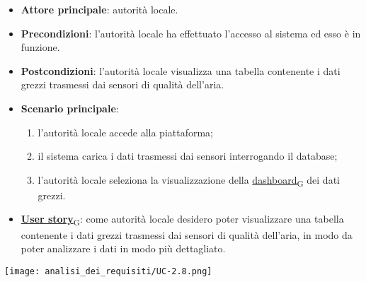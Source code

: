 \begin{itemize}
	\item \textbf{Attore principale}: autorità locale.
	\item \textbf{Precondizioni}: l'autorità locale ha effettuato l'accesso al sistema ed esso è in funzione.
	\item \textbf{Postcondizioni}: l'autorità locale visualizza una tabella contenente i dati grezzi trasmessi dai sensori di qualità dell'aria.
	\item \textbf{Scenario principale}:
	      \begin{enumerate}
		      \item l'autorità locale accede alla piattaforma;
		      \item il sistema carica i dati trasmessi dai sensori interrogando il database;
		      \item l'autorità locale seleziona la visualizzazione della \href{https://7last.github.io/docs/rtb/documentazione-interna/glossario\#dashboard}{dashboard\textsubscript{G}} dei dati grezzi.
	      \end{enumerate}
	\item \href{https://7last.github.io/docs/rtb/documentazione-interna/glossario\#user-story}{\textbf{User story}\textsubscript{G}}:
	      come autorità locale desidero poter visualizzare una tabella contenente i dati grezzi trasmessi dai sensori di qualità dell'aria,
	      in modo da poter analizzare i dati in modo più dettagliato.
\end{itemize}
\begin{center}
	\texttt{[image: analisi\_dei\_requisiti/UC-2.8.png]}
\end{center}

\newpage

